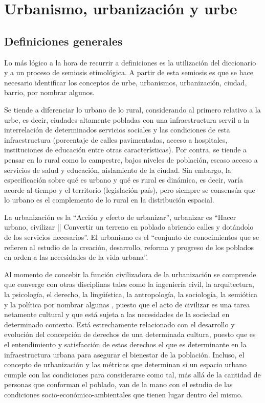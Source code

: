 \section{Urbanismo, urbanización y urbe}

\subsection{Definiciones generales}

Lo más lógico a la hora de recurrir a definiciones es la utilización del diccionario y a un proceso
de semiosis etimológica. A partir de esta semiosis es que se hace necesario identificar los
conceptos de urbe, urbanismos, urbanización, ciudad, barrio, por nombrar algunos.

Se tiende a diferenciar lo urbano de lo rural, considerando al primero relativo a la
urbe, es decir, ciudades altamente pobladas con una infraestructura servil a la interrelación de
determinados servicios sociales y las condiciones de esta infraestructura (porcentaje de calles
pavimentadas, acceso a hospitales, instituciones de educación entre otras características). Por
contra, se tiende a pensar en lo rural como lo campestre, bajos niveles de población, escaso acceso
a servicios de salud y educación, aislamiento de la ciudad. Sin embargo, la especificación sobre qué
es urbano y qué es rural es dinámica, es decir, varía acorde al tiempo y el territorio (legislación
país), pero siempre se consensúa que lo urbano es el complemento de lo rural en la distribución
espacial.

La urbanización es la ``Acción y efecto de urbanizar'', urbanizar es ``Hacer urbano, civilizar ||
Convertir un terreno en poblado abriendo calles y dotándolo de los servicios necesarios''. 
El urbanismo es el ``conjunto de conocimientos que se refieren al estudio de la creación,
desarrollo, reforma y progreso de los poblados en orden a las necesidades de la vida urbana''.

Al momento de concebir la función civilizadora de la urbanización se comprende que 
converge con otras disciplinas tales como la ingeniería civil, la arquitectura, la psicología, el
derecho, la lingüística, la antropología, la sociología, la semiótica y la política por nombrar algunas
\cite{Wkur}, puesto que el acto de civilizar es una tarea netamente cultural y que está sujeta a las
necesidades de la sociedad en determinado contexto. Está estrechamente relacionado con el desarrollo
y evolución del concepción de derechos de una determinada cultura, puesto que es el entendimiento y
satisfacción de estos derechos el que es determinante en la infraestructura urbana para asegurar el
bienestar de la población. Incluso, el concepto de urbanización y las métricas que determinan si un
espacio urbano cumple con las condiciones para considerarse como tal, más allá de la cantidad de
personas que conforman el poblado, van de la mano con el estudio de las condiciones
socio-económico-ambientales que tienen lugar dentro del mismo.


